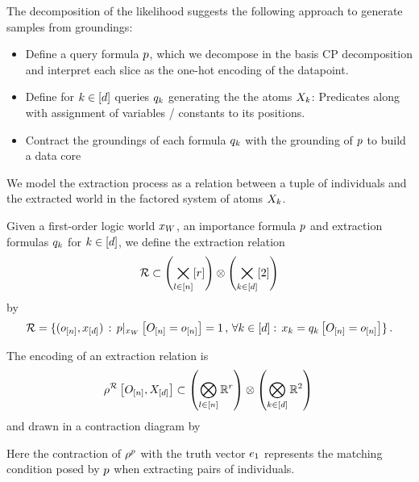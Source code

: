 
The decomposition of the likelihood suggests the following approach to generate samples from groundings:
\begin{itemize}
    \item Define a query formula $p$, which we decompose in the basis CP decomposition and interpret each slice as the one-hot encoding of the datapoint.
    \item Define for $k\in[d]$ queries $q_{k}$ generating the the atoms $X_{k}$:
    Predicates along with assignment of variables / constants to its positions.
    \item Contract the groundings of each formula $q_{k}$ with the grounding of $p$ to build a data core
\end{itemize}



We model the extraction process as a relation between a tuple of individuals and the extracted world in the factored system of atoms $X_{k}$.

\begin{definition}
    \label{def:extractionRelation}
    Given a first-order logic world $x_{W}$, an importance formula $p$ and extraction formulas $q_{k}$ for $k\in[d]$, we define the extraction relation
    \begin{align*}
        \mathcal{R} \subset \left(\bigtimes_{l\in[n]}[r]\right) \otimes \left(\bigtimes_{k\in[d]}[2]\right)
    \end{align*}
    by
    \begin{align*}
        \mathcal{R}
        = \{ (o_{[n]}, x_{[d]})
        \, : \,  {p}|_{x_{W}} \left[O_{[n]}=o_{[n]}\right] = 1 \, , \, \forall {k\in[d]} : \,  x_{k} = q_{k}\left[O_{[n]}=o_{[n]}\right] \} \, .
    \end{align*}
\end{definition}

The encoding of an extraction relation is
\begin{align*}
    \rho^{\mathcal{R}}\left[O_{[n]},X_{[d]}\right] \subset \left(\bigotimes_{l\in[n]}\mathbb{R}^{r}\right) \otimes \left(\bigotimes_{k\in[d]}\mathbb{R}^2\right) \,
\end{align*}
and drawn in a contraction diagram by
\begin{center}
    
\end{center}
Here the contraction of $\rho^{p}$ with the truth vector $e_1$ represents the matching condition posed by $p$ when extracting pairs of individuals.


